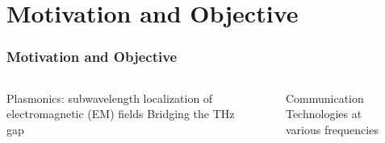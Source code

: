 \documentclass[mathserif,16pt,xcolor=table]{beamer}
\begin{document}
\section{Motivation and Objective}
\begin{frame}
  \frametitle{Motivation and Objective}
  \begin{columns} %
    \begin{column}{.5\textwidth} \vspace*{-1cm}
      \begin{outline}[itemize]
        \1 Plasmonics: subwavelength localization of electromagnetic (EM) fields
        \1 Bridging the THz gap
      \end{outline}
    \end{column}
    \begin{column}{.5\textwidth}
      \begin{figure}
        \centering \hspace*{-0.75cm}
        \fontsize{6}{7}\selectfont
        \def\svgwidth{1.1\linewidth}
        
        \label{fig:spp_2deg}
        \caption{Communication Technologies at various frequencies}
      \end{figure}
    \end{column}%
  \end{columns}
\end{frame}
\end{document}
